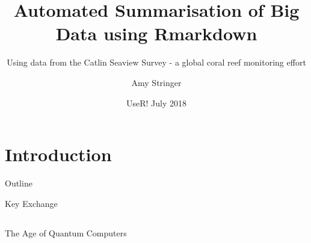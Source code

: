\documentclass{beamer}
\title{Automated Summarisation of Big Data using Rmarkdown}
\subtitle{Using data from the Catlin Seaview Survey - a global coral reef monitoring effort}
\author{Amy Stringer}
\institute[Global Change Institute] %
{
  \inst{1}%
  University of Queensland
}
\date{UseR! July 2018}
\begin{document}
    \section{Introduction}
        \begin{frame}
          \titlepage
        \end{frame}
        
        \begin{frame}{Outline}
          \tableofcontents
        \end{frame}

        \begin{frame}{Key Exchange}
        

            
        \end{frame}

    \subsection{}




    \subsection{}



        \begin{frame}{The Age of Quantum Computers}
          
        \end{frame}
        
\end{document}
